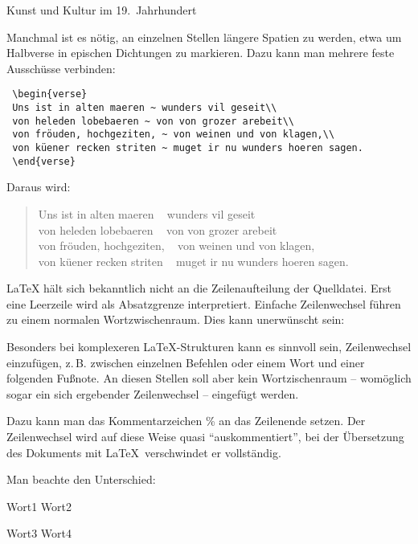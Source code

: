 \begin{LTXexample}
 Kunst und Kultur im 19.~Jahrhundert
\end{LTXexample}

Manchmal ist es nötig, an einzelnen Stellen längere Spatien zu werden, etwa um Halbverse 
in epischen Dichtungen zu markieren. Dazu kann man mehrere feste Ausschüsse verbinden:

\begin{lstlisting}
 \begin{verse}
 Uns ist in alten maeren ~ wunders vil geseit\\
 von heleden lobebaeren ~ von von grozer arebeit\\
 von fröuden, hochgeziten, ~ von weinen und von klagen,\\
 von küener recken striten ~ muget ir nu wunders hoeren sagen.
 \end{verse}
\end{lstlisting}

Daraus wird:

 \begin{verse}
 Uns ist in alten maeren ~ wunders vil geseit\\
 von heleden lobebaeren ~ von von grozer arebeit\\
 von fröuden, hochgeziten, ~ von weinen und von klagen,\\
 von küener recken striten ~ muget ir nu wunders hoeren sagen.
 \end{verse}



\LaTeX{} hält sich bekanntlich nicht an die Zeilenaufteilung der Quelldatei. Erst eine Leerzeile
wird als Absatzgrenze interpretiert. Einfache Zeilenwechsel führen zu einem normalen 
Wortzwischenraum. Dies kann unerwünscht sein:

Besonders bei komplexeren \LaTeX -Strukturen kann es sinnvoll sein, Zeilenwechsel einzufügen,
z.\,B. zwischen einzelnen Befehlen oder einem Wort und einer folgenden Fußnote.
An diesen Stellen soll aber kein Wortzischenraum -- womöglich sogar ein sich ergebender 
Zeilenwechsel -- eingefügt werden.

Dazu kann man das Kommentarzeichen \% an das Zeilenende setzen. Der Zeilenwechsel wird auf diese 
Weise quasi \enquote{auskommentiert}, bei der Übersetzung des Dokuments mit \LaTeX\
verschwindet er vollständig.

Man beachte den Unterschied:

\begin{LTXexample}
 Wort1
 Wort2
 
 Wort3%
 Wort4
\end{LTXexample}


